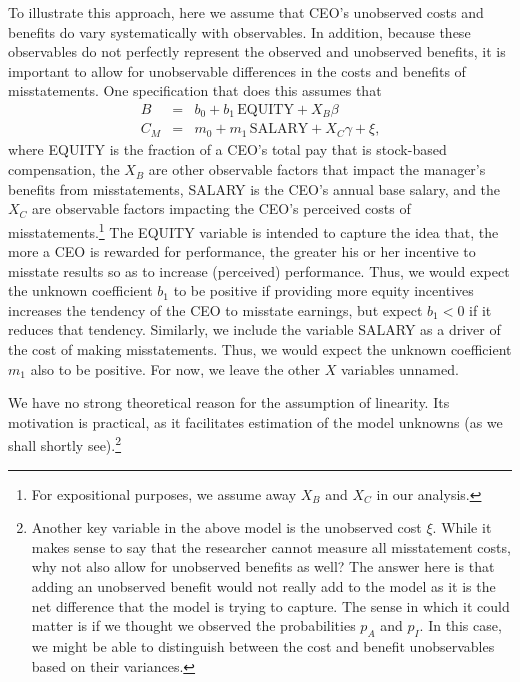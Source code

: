 To illustrate this approach, here we assume that CEO's unobserved costs and benefits do vary systematically with observables.
In addition, because these observables do not perfectly represent the observed and unobserved benefits, it is important to allow for unobservable differences in the costs and benefits of misstatements. 
One specification that does this assumes that
%
\begin{equation}
\begin{array}{lcl}\label{eqns1}
B & = & b_0 + b_1 \, \mbox{EQUITY} + X_B\beta\\[.5em]
C_M & = & m_0 + m_1 \, \mbox{SALARY} + X_C\gamma + \xi \text{,} %
\end{array}
\end{equation}
where EQUITY is the fraction of a CEO's total pay that is stock-based compensation, 
the $X_B$ are other observable factors that impact the manager's benefits from misstatements,
SALARY is the CEO's annual base salary, and the $X_C$ are observable factors impacting the CEO's perceived costs of misstatements.\footnote{
For expositional purposes, we assume away $X_B$ and $X_C$ in our analysis.}
The EQUITY variable is intended to capture the idea that, the more a CEO is rewarded for performance, the greater his or her incentive to misstate results so as to increase (perceived) performance.
Thus, we would expect the unknown coefficient $b_1$ to be positive if providing more equity incentives increases the tendency of the CEO to misstate earnings, but expect $b_1 < 0$ if it reduces that tendency.
Similarly, we include the variable SALARY as a driver of the cost of making misstatements. 
Thus, we would expect the unknown coefficient $m_1$ also to be positive.
For now, we leave the other $X$ variables unnamed.

We have no strong theoretical reason for the assumption of linearity. Its motivation is practical, as it facilitates estimation of the model unknowns (as we shall shortly see).\footnote{Another key variable in the above model is the unobserved cost $\xi$.
While it makes sense to say that the researcher cannot measure all misstatement costs, why not also allow for unobserved benefits as well?
The answer here is that adding an unobserved benefit would not really add to the model as it is the net difference that the model is trying to capture.
The sense in which it could matter is if we thought we observed the probabilities $p_A$ and $p_I$.
In this case, we might be able to distinguish between the cost and benefit unobservables based on their variances.}
 
